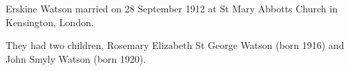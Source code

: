 
Erskine Watson married  on 28 September 1912 at St Mary Abbotts Church in Kensington, London.

They had two children, Rosemary Elizabeth St George Watson (born 1916) and John Smyly Watson (born 1920).
